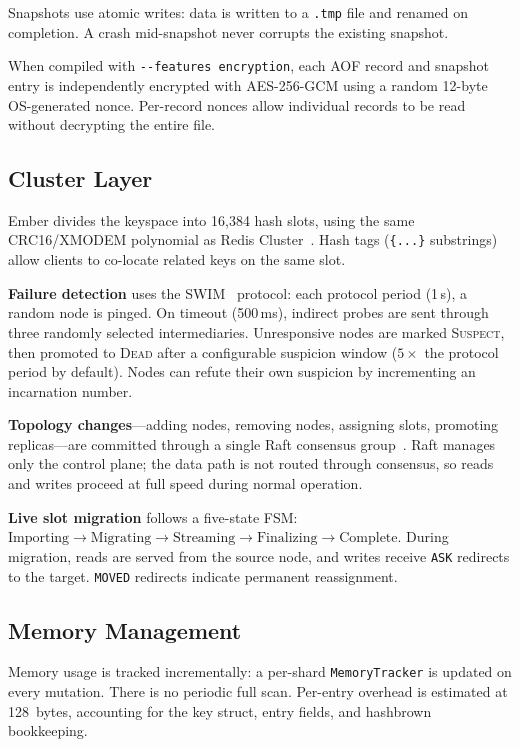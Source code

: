 \documentclass[conference]{IEEEtran}
\begin{document}
Snapshots use atomic writes: data is written to a \texttt{.tmp} file
and renamed on completion. A crash mid-snapshot never corrupts the
existing snapshot.

When compiled with \texttt{-{}-features encryption}, each AOF record
and snapshot entry is independently encrypted with AES-256-GCM using
a random 12-byte OS-generated nonce. Per-record nonces allow
individual records to be read without decrypting the entire file.


\subsection{Cluster Layer}

Ember divides the keyspace into 16,384 hash slots, using the same
CRC16/XMODEM polynomial as Redis Cluster~\cite{redis-cluster}.
Hash tags (\texttt{\{...\}} substrings) allow clients to co-locate
related keys on the same slot.

\textbf{Failure detection} uses the SWIM~\cite{swim} protocol: each
protocol period (1\,s), a random node is pinged. On timeout (500\,ms),
indirect probes are sent through three randomly selected intermediaries.
Unresponsive nodes are marked \textsc{Suspect}, then promoted to
\textsc{Dead} after a configurable suspicion window ($5\times$ the
protocol period by default). Nodes can refute their own suspicion by
incrementing an incarnation number.

\textbf{Topology changes}---adding nodes, removing nodes, assigning
slots, promoting replicas---are committed through a single Raft
consensus group~\cite{raft}. Raft manages only the control plane;
the data path is not routed through consensus, so reads and writes
proceed at full speed during normal operation.

\textbf{Live slot migration} follows a five-state FSM:
$\text{Importing} \to \text{Migrating} \to \text{Streaming} \to
\text{Finalizing} \to \text{Complete}$. During migration, reads are
served from the source node, and writes receive \texttt{ASK}
redirects to the target. \texttt{MOVED} redirects indicate permanent
reassignment.


\subsection{Memory Management}

Memory usage is tracked incrementally: a per-shard
\texttt{MemoryTracker} is updated on every mutation. There is no
periodic full scan. Per-entry overhead is estimated at 128~bytes,
accounting for the key struct, entry fields, and hashbrown bookkeeping.
\end{document}

